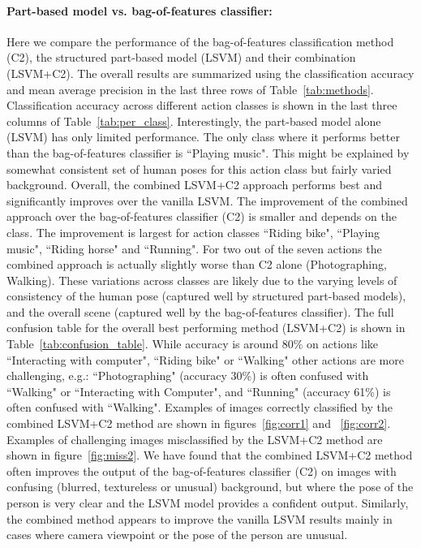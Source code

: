 \documentclass{bmvc2k}
\begin{document}
\paragraph{Part-based model vs. bag-of-features classifier:}
Here we compare the performance of the bag-of-features classification
method (C2),
the structured part-based model (LSVM) and their combination (LSVM+C2).
The overall results are summarized using the classification accuracy
and mean average precision in the last three rows of
Table~\ref{tab:methods}. Classification accuracy across different
action classes is shown in the last three columns of
Table~\ref{tab:per_class}. Interestingly, the part-based model alone
(LSVM) has only limited performance.
The only class where it performs better than the bag-of-features
classifier is ``Playing music".
This might be explained by somewhat consistent set  of human poses for
this action class but fairly varied background.
Overall, the combined LSVM+C2 approach performs best and significantly
improves over the vanilla LSVM.
The improvement of the combined approach over the bag-of-features
classifier (C2) is smaller and depends on the class.
The improvement is largest for action classes ``Riding bike",
``Playing music", ``Riding horse" and ``Running".
For two out of the seven actions the combined approach is actually
slightly worse than C2 alone (Photographing, Walking).
These variations across classes are likely due to the varying levels
of consistency of the human pose (captured well by
structured part-based models), and the overall scene (captured well by
the bag-of-features classifier).
The full confusion table for the overall best performing method
(LSVM+C2) is shown in Table~\ref{tab:confusion_table}.
While accuracy is around 80\% on actions like ``Interacting with
computer", ``Riding bike" or ``Walking" other
actions are more challenging, e.g.: ``Photographing" (accuracy 30\%)
is often confused with ``Walking" or ``Interacting with Computer", and
``Running" (accuracy 61\%) is often confused with ``Walking".
Examples of images correctly classified by the combined LSVM+C2 method
are shown in figures~\ref{fig:corr1} and ~\ref{fig:corr2}.
Examples of challenging images misclassified by the LSVM+C2 method are
shown in figure~\ref{fig:miss2}.
We have found that the combined LSVM+C2 method often improves the
output of  the bag-of-features
 classifier (C2) on images with confusing (blurred, textureless or
unusual) background, but where the pose of the person
is very clear and  the LSVM model provides a confident output.
Similarly, the combined method appears to improve the vanilla LSVM
results mainly in cases where camera viewpoint or the pose of the
person are unusual.
\end{document}
